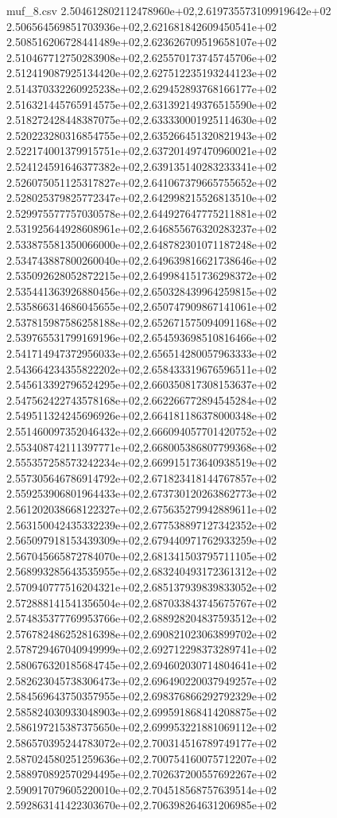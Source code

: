 \begin{filecontents*}{muf_8.csv}
2.504612802112478960e+02,2.619735573109919642e+02
2.506564569851703936e+02,2.621681842609450541e+02
2.508516206728441489e+02,2.623626709519658107e+02
2.510467712750283908e+02,2.625570173745745706e+02
2.512419087925134420e+02,2.627512235193244123e+02
2.514370332260925238e+02,2.629452893768166177e+02
2.516321445765914575e+02,2.631392149376515590e+02
2.518272428448387075e+02,2.633330001925114630e+02
2.520223280316854755e+02,2.635266451320821943e+02
2.522174001379915751e+02,2.637201497470960021e+02
2.524124591646377382e+02,2.639135140283233341e+02
2.526075051125317827e+02,2.641067379665755652e+02
2.528025379825772347e+02,2.642998215526813510e+02
2.529975577757030578e+02,2.644927647775211881e+02
2.531925644928608961e+02,2.646855676320283237e+02
2.533875581350066000e+02,2.648782301071187248e+02
2.534743887800260040e+02,2.649639816621738646e+02
2.535092628052872215e+02,2.649984151736298372e+02
2.535441363926880456e+02,2.650328439964259815e+02
2.535866314686045655e+02,2.650747909867141061e+02
2.537815987586258188e+02,2.652671575094091168e+02
2.539765531799169196e+02,2.654593698510816466e+02
2.541714947372956033e+02,2.656514280057963333e+02
2.543664234355822202e+02,2.658433319676596511e+02
2.545613392796524295e+02,2.660350817308153637e+02
2.547562422743578168e+02,2.662266772894545284e+02
2.549511324245696926e+02,2.664181186378000348e+02
2.551460097352046432e+02,2.666094057701420752e+02
2.553408742111397771e+02,2.668005386807799368e+02
2.555357258573242234e+02,2.669915173640938519e+02
2.557305646786914792e+02,2.671823418144767857e+02
2.559253906801964433e+02,2.673730120263862773e+02
2.561202038668122327e+02,2.675635279942889611e+02
2.563150042435332239e+02,2.677538897127342352e+02
2.565097918153439309e+02,2.679440971762933259e+02
2.567045665872784070e+02,2.681341503795711105e+02
2.568993285643535955e+02,2.683240493172361312e+02
2.570940777516204321e+02,2.685137939839833052e+02
2.572888141541356504e+02,2.687033843745675767e+02
2.574835377769953766e+02,2.688928204837593512e+02
2.576782486252816398e+02,2.690821023063899702e+02
2.578729467040949999e+02,2.692712298373289741e+02
2.580676320185684745e+02,2.694602030714804641e+02
2.582623045738306473e+02,2.696490220037949257e+02
2.584569643750357955e+02,2.698376866292792329e+02
2.585824030933048903e+02,2.699591868414208875e+02
2.586197215387375650e+02,2.699953221881069112e+02
2.586570395244783072e+02,2.700314516789749177e+02
2.587024580251259636e+02,2.700754160075712207e+02
2.588970892570294495e+02,2.702637200557692267e+02
2.590917079605220010e+02,2.704518568757639514e+02
2.592863141422303670e+02,2.706398264631206985e+02

\end{filecontents*}
